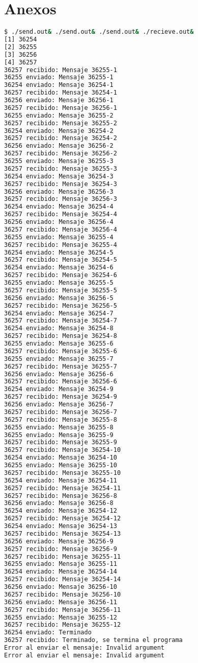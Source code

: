\section{Anexos}




\begin{lstlisting}[language=bash, style=CodeStyle, caption=Tres productores y un consumidor, label=lst:3producidores1consumidor]
$ ./send.out& ./send.out& ./send.out& ./recieve.out&
[1] 36254
[2] 36255
[3] 36256
[4] 36257
36257 recibido: Mensaje 36255-1
36255 enviado: Mensaje 36255-1
36254 enviado: Mensaje 36254-1
36257 recibido: Mensaje 36254-1
36256 enviado: Mensaje 36256-1
36257 recibido: Mensaje 36256-1
36255 enviado: Mensaje 36255-2
36257 recibido: Mensaje 36255-2
36254 enviado: Mensaje 36254-2
36257 recibido: Mensaje 36254-2
36256 enviado: Mensaje 36256-2
36257 recibido: Mensaje 36256-2
36255 enviado: Mensaje 36255-3
36257 recibido: Mensaje 36255-3
36254 enviado: Mensaje 36254-3
36257 recibido: Mensaje 36254-3
36256 enviado: Mensaje 36256-3
36257 recibido: Mensaje 36256-3
36254 enviado: Mensaje 36254-4
36257 recibido: Mensaje 36254-4
36256 enviado: Mensaje 36256-4
36257 recibido: Mensaje 36256-4
36255 enviado: Mensaje 36255-4
36257 recibido: Mensaje 36255-4
36254 enviado: Mensaje 36254-5
36257 recibido: Mensaje 36254-5
36254 enviado: Mensaje 36254-6
36257 recibido: Mensaje 36254-6
36255 enviado: Mensaje 36255-5
36257 recibido: Mensaje 36255-5
36256 enviado: Mensaje 36256-5
36257 recibido: Mensaje 36256-5
36254 enviado: Mensaje 36254-7
36257 recibido: Mensaje 36254-7
36254 enviado: Mensaje 36254-8
36257 recibido: Mensaje 36254-8
36255 enviado: Mensaje 36255-6
36257 recibido: Mensaje 36255-6
36255 enviado: Mensaje 36255-7
36257 recibido: Mensaje 36255-7
36256 enviado: Mensaje 36256-6
36257 recibido: Mensaje 36256-6
36254 enviado: Mensaje 36254-9
36257 recibido: Mensaje 36254-9
36256 enviado: Mensaje 36256-7
36257 recibido: Mensaje 36256-7
36257 recibido: Mensaje 36255-8
36255 enviado: Mensaje 36255-8
36255 enviado: Mensaje 36255-9
36257 recibido: Mensaje 36255-9
36257 recibido: Mensaje 36254-10
36254 enviado: Mensaje 36254-10
36255 enviado: Mensaje 36255-10
36257 recibido: Mensaje 36255-10
36254 enviado: Mensaje 36254-11
36257 recibido: Mensaje 36254-11
36257 recibido: Mensaje 36256-8
36256 enviado: Mensaje 36256-8
36254 enviado: Mensaje 36254-12
36257 recibido: Mensaje 36254-12
36254 enviado: Mensaje 36254-13
36257 recibido: Mensaje 36254-13
36256 enviado: Mensaje 36256-9
36257 recibido: Mensaje 36256-9
36257 recibido: Mensaje 36255-11
36255 enviado: Mensaje 36255-11
36254 enviado: Mensaje 36254-14
36257 recibido: Mensaje 36254-14
36256 enviado: Mensaje 36256-10
36257 recibido: Mensaje 36256-10
36256 enviado: Mensaje 36256-11
36257 recibido: Mensaje 36256-11
36255 enviado: Mensaje 36255-12
36257 recibido: Mensaje 36255-12
36254 enviado: Terminado
36257 recibido: Terminado, se termina el programa
Error al enviar el mensaje: Invalid argument
Error al enviar el mensaje: Invalid argument


\end{lstlisting}
